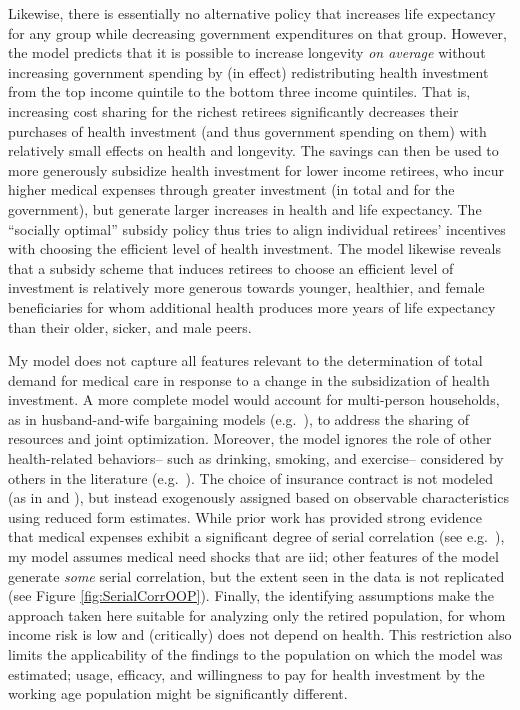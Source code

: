 \documentclass[12pt,pdftex,letterpaper]{article}
\begin{document}
Likewise, there is essentially no alternative policy that increases life expectancy for any group while decreasing government expenditures on that group.  However, the model predicts that it is possible to increase longevity \textit{on average} without increasing government spending by (in effect) redistributing health investment from the top income quintile to the bottom three income quintiles.  That is, increasing cost sharing for the richest retirees significantly decreases their purchases of health investment (and thus government spending on them) with relatively small effects on health and longevity.  The savings can then be used to more generously subsidize health investment for lower income retirees, who incur higher medical expenses through greater investment (in total and for the government), but generate larger increases in health and life expectancy. The ``socially optimal'' subsidy policy thus tries to align individual retirees' incentives with choosing the efficient level of health investment.  The model likewise reveals that a subsidy scheme that induces retirees to choose an efficient level of investment is relatively more generous towards younger, healthier, and female beneficiaries for whom additional health produces more years of life expectancy than their older, sicker, and male peers.

My model does not capture all features relevant to the determination of total demand for medical care in response to a change in the subsidization of health investment.  A more complete model would account for multi-person households, as in husband-and-wife bargaining models (e.g.\ \cite{blau06}), to address the sharing of resources and joint optimization.  Moreover, the model ignores the role of other health-related behaviors-- such as drinking, smoking, and exercise-- considered by others in the literature (e.g.\ \cite{khwaja10}).  The choice of insurance contract is not modeled (as in \cite{cardon01} and \cite{einav13}), but instead exogenously assigned based on observable characteristics using reduced form estimates.  While prior work has provided strong evidence that medical expenses exhibit a significant degree of serial correlation (see e.g.\ \cite{french04}), my model assumes medical need shocks that are iid; other features of the model generate \textit{some} serial correlation, but the extent seen in the data is not replicated (see Figure \ref{fig:SerialCorrOOP}).  Finally, the identifying assumptions make the approach taken here suitable for analyzing only the retired population, for whom income risk is low and (critically) does not depend on health.  This restriction also limits the applicability of the findings to the population on which the model was estimated; usage, efficacy, and willingness to pay for health investment by the working age population might be significantly different.
\end{document}
